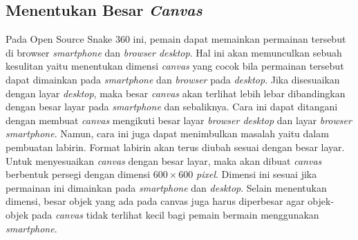 \subsection{Menentukan Besar \textit{Canvas}}
Pada Open Source Snake 360 ini, pemain dapat memainkan permainan tersebut di browser \textit{smartphone} dan \textit{browser desktop}. Hal ini akan memunculkan sebuah kesulitan yaitu menentukan dimensi \textit{canvas} yang cocok bila permainan tersebut dapat dimainkan pada \textit{smartphone} dan \textit{browser} pada \textit{desktop}. Jika disesuaikan dengan layar \textit{desktop}, maka besar \textit{canvas} akan terlihat lebih lebar dibandingkan dengan besar layar pada \textit{smartphone} dan sebaliknya. Cara ini dapat ditangani dengan membuat \textit{canvas} mengikuti besar layar \textit{browser desktop} dan layar \textit{browser smartphone}. Namun, cara ini juga dapat menimbulkan masalah yaitu dalam pembuatan labirin. Format labirin akan terus diubah sesuai dengan besar layar. Untuk menyesuaikan \textit{canvas} dengan besar layar, maka akan dibuat \textit{canvas} berbentuk persegi dengan dimensi $600 \times 600$ \textit{pixel}. Dimensi ini sesuai jika permainan ini dimainkan pada \textit{smartphone} dan \textit{desktop}. Selain menentukan dimensi, besar objek yang ada pada canvas juga harus diperbesar agar objek-objek pada \textit{canvas} tidak terlihat kecil bagi pemain bermain menggunakan \textit{smartphone}. 

